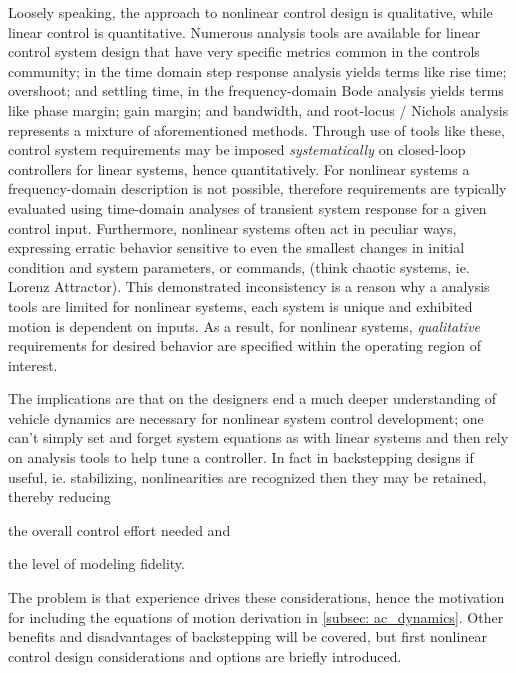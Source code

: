 \documentclass[12pt]{ucthesis}
\begin{document}
Loosely speaking, the approach to nonlinear control design is qualitative, while linear control is quantitative. Numerous analysis tools are available for linear control system design that have very specific metrics common in the controls community; in the time domain step response analysis yields terms like rise time; overshoot; and settling time, in the frequency-domain Bode analysis yields terms like phase margin; gain margin; and bandwidth, and root-locus / Nichols analysis represents a mixture of aforementioned methods. Through use of tools like these, control system requirements may be imposed \textit{systematically} on closed-loop controllers for linear systems, hence quantitatively. For nonlinear systems a frequency-domain description is not possible, therefore requirements are typically evaluated using time-domain analyses of transient system response for a given control input. Furthermore, nonlinear systems often act in peculiar ways, expressing erratic behavior sensitive to even the smallest changes in initial condition and system parameters, or commands, (think chaotic systems, ie. Lorenz Attractor). This demonstrated inconsistency is a reason why a analysis tools are limited for nonlinear systems, each system is unique and exhibited motion is dependent on inputs. As a result, for nonlinear systems, \textit{qualitative} requirements for desired behavior are specified within the operating region of interest.

The implications are that on the designers end a much deeper understanding of vehicle dynamics are necessary for nonlinear system control development; one can't simply set and forget system equations as with linear systems and then rely on analysis tools to help tune a controller. In fact in backstepping designs if useful, ie. stabilizing, nonlinearities are recognized then they may be retained, thereby reducing \begin{inparaenum} \item{the overall control effort needed} and \item{the level of modeling fidelity.} \end{inparaenum} The problem is that experience drives these considerations, hence the motivation for including the equations of motion derivation in \autoref{subsec: ac_dynamics}. Other benefits and disadvantages of backstepping will be covered, but first nonlinear control design considerations and options are briefly introduced.
\end{document}
